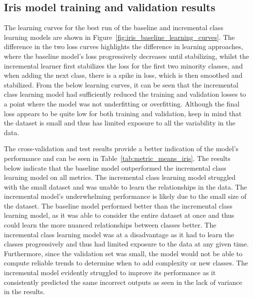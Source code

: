 \documentclass[conference]{IEEEtran}
\begin{document}
\subsection{Iris model training and validation results}
The learning curves for the best run of the baseline and incremental class learning models are shown in Figure~\ref{fig:iris_baseline_learning_curves}. 
The difference in the two loss curves highlights the difference in learning approaches, where the baseline 
model's loss progressively decreases until stabilizing, whilst the incremental learner first stabilizes the 
loss for the first two minority classes, and when adding the next class, there is a spike in loss, which is then smoothed and stabilized.
From the below learning curves, it can be seen that the incremental class learning model had 
sufficiently reduced the training and validation losses to a point where the model was not underfitting or overfitting. Although the final loss 
appears to be quite low for both training and validation, keep in mind that the dataset is small and thus has limited 
exposure to all the variability in the data.

 The cross-validation and test results provide a better indication of the model's performance and can be seen in Table~\ref{tab:metric_means_iris}.
The results below indicate that the baseline model outperformed the incremental class learning model on all metrics. The incremental class learning 
model struggled with the small dataset and was unable to learn the relationships in the data. The incremental model's underwhelming performance is likely due 
to the small size of the dataset. The baseline model performed better than the incremental class learning model, as it was able to consider the 
entire dataset at once and thus could learn the more nuanced relationships between classes better. The incremental class learning model was at a disadvantage as it had to learn the classes
progressively and thus had limited exposure to the data at any given time. Furthermore, since the validation set was small, the model 
would not be able to compute reliable trends to determine when to add complexity or new classes. The incremental model evidently struggled to 
improve its performance as it consistently predicted the same incorrect outputs as seen in the lack of variance in the results.
\end{document}
